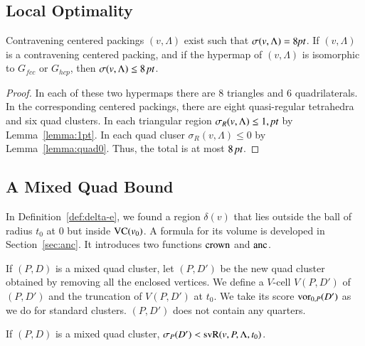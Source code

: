 \subsection{Local Optimality}%
\label{sec:local-opt}

\begin{lemma}  %
Contravening centered packings $(v,\Lambda)$ exist such that
$\sigma(v,\Lambda)=8\hbox{\it pt}$. If $(v,\Lambda)$ is a contravening centered packing, and
if the hypermap of $(v,\Lambda)$ is isomorphic to $G_{fcc}$ or $G_{hcp}$,
then $\sigma(v,\Lambda) \le 8\,\hbox{\it pt}$.
\end{lemma} %

\begin{proof}
In each of these two hypermaps there are $8$ triangles and
$6$ quadrilaterals.  In the corresponding centered packings,
there are  eight quasi-regular tetrahedra and six quad clusters.
In each triangular region $\sigma_R(v,\Lambda)\le 1,\hbox{\it pt}$ by Lemma~\ref{lemma:1pt}.
In each quad cluser $\sigma_R(v,\Lambda)\le 0$ by Lemma~\ref{lemma:quad0}.  
Thus, the total is
at most $8\,\hbox{\it pt}$.
\end{proof}











\subsection{A Mixed Quad Bound}%

In Definition~\ref{def:delta-e}, we found a region $\delta(v)$
that lies outside the ball of radius $t_0$ at $0$ but inside
${\operatorname{VC}}(v_0)$.  A formula for its volume is developed
in Section~\ref{sec:anc}.  It introduces two functions
$\operatorname{crown}$ and $\operatorname{anc}$.


\smallskip
If $(P,D)$ is a mixed quad cluster, let $(P,D')$ be the new quad
cluster obtained by removing all the enclosed vertices.  We define
a $V$-cell $V(P,D')$ of $(P,D')$ and the truncation of $V(P,D')$
at $t_0$. We take its score ${\operatorname{vor}}_{0,P}(D')$  as we do for
standard clusters.  $(P,D')$ does not contain any quarters.

\begin{lemma} \label{lemma:mixed-vor0}
If $(P,D)$ is a mixed quad cluster, $\sigma_P(D') <
{\operatorname{svR}}(v,P,\Lambda,t_0)$.  
\end{lemma}

